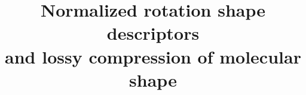 \documentclass[10pt,journal]{IEEEtranTCOM}
\theoremstyle{plain}
\begin{document}
\newcommand{\bea}{\begin{eqnarray}}
\newcommand{\eea}{\end{eqnarray}}
\newcommand{\be}{\begin{equation}}
\newcommand{\ee}{\end{equation}}
\newcommand{\beas}{\begin{eqnarray*}}
\newcommand{\eeas}{\end{eqnarray*}}
\newcommand{\bs}{\backslash}
\newcommand{\bc}{\begin{center}}
\newcommand{\ec}{\end{center}}
\def\SC {\mathscr{C}}

\title{Normalized rotation shape descriptors \\ and lossy compression of molecular shape}
\author{\\
}
\maketitle
\end{document}
